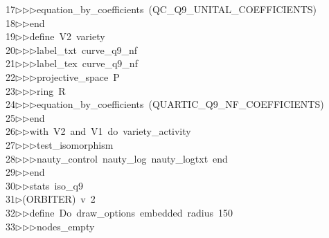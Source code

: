 \begin{tabbing}
17\>$\triangleright$\>$\triangleright$\>$\triangleright$\>equation\_by\_coefficients\ (QC\_Q9\_UNITAL\_COEFFICIENTS)\ \\[0pt]
18\>$\triangleright$\>$\triangleright$\>end\ \\[0pt]
19\>$\triangleright$\>$\triangleright$\>define\ V2\ variety\ \\[0pt]
20\>$\triangleright$\>$\triangleright$\>$\triangleright$\>label\_txt\ curve\_q9\_nf\ \\[0pt]
21\>$\triangleright$\>$\triangleright$\>$\triangleright$\>label\_tex\ curve\_q9\_nf\ \\[0pt]
22\>$\triangleright$\>$\triangleright$\>$\triangleright$\>projective\_space\ P\ \\[0pt]
23\>$\triangleright$\>$\triangleright$\>$\triangleright$\>ring\ R\ \\[0pt]
24\>$\triangleright$\>$\triangleright$\>$\triangleright$\>equation\_by\_coefficients\ (QUARTIC\_Q9\_NF\_COEFFICIENTS)\ \\[0pt]
25\>$\triangleright$\>$\triangleright$\>end\ \\[0pt]
26\>$\triangleright$\>$\triangleright$\>with\ V2\ and\ V1\ do\ variety\_activity\ \\[0pt]
27\>$\triangleright$\>$\triangleright$\>$\triangleright$\>test\_isomorphism\ \\[0pt]
28\>$\triangleright$\>$\triangleright$\>$\triangleright$\>nauty\_control\ nauty\_log\ nauty\_logtxt\ end\ \\[0pt]
29\>$\triangleright$\>$\triangleright$\>end\ \\[0pt]
30\>$\triangleright$\>$\triangleright$\>stats\ iso\_q9\\[0pt]
31\>$\triangleright$\>(ORBITER)\ v\ 2\ \\[0pt]
32\>$\triangleright$\>$\triangleright$\>define\ Do\ draw\_options\ embedded\ radius\ 150\ \\[0pt]
33\>$\triangleright$\>$\triangleright$\>$\triangleright$\>nodes\_empty\ \\[0pt]

\end{tabbing}
